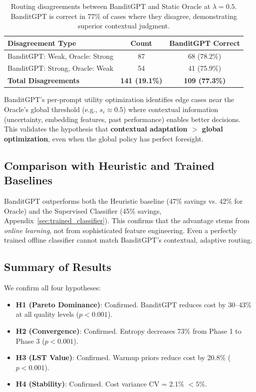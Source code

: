 \begin{table}[h]
\centering
\small
\begin{tabular}{@{}lcc@{}}
\toprule
\textbf{Disagreement Type} & \textbf{Count} & \textbf{BanditGPT Correct} \\ \midrule
BanditGPT: Weak, Oracle: Strong & 87 & 68 (78.2\%) \\
BanditGPT: Strong, Oracle: Weak & 54 & 41 (75.9\%) \\
\midrule
\textbf{Total Disagreements} & \textbf{141 (19.1\%)} & \textbf{109 (77.3\%)} \\
\bottomrule
\end{tabular}
\caption{%
    Routing disagreements between BanditGPT and Static Oracle at $\lambda=0.5$. 
    BanditGPT is correct in 77\% of cases where they disagree, demonstrating superior contextual judgment.
}
\label{tab:disagreements}
\end{table}

BanditGPT's per-prompt utility optimization identifies edge cases near the Oracle's global threshold (e.g., $s_i \approx 0.5$) where contextual information (uncertainty, embedding features, past performance) enables better decisions. This validates the hypothesis that \textbf{contextual adaptation $>$ global optimization}, even when the global policy has perfect foresight.

\subsection{Comparison with Heuristic and Trained Baselines}

BanditGPT outperforms both the Heuristic baseline (47\% savings vs. 42\% for Oracle) and the Supervised Classifier (45\% savings, Appendix~\ref{sec:trained_classifier}). This confirms that the advantage stems from \emph{online learning}, not from sophisticated feature engineering. Even a perfectly trained offline classifier cannot match BanditGPT's contextual, adaptive routing.

\subsection{Summary of Results}

We confirm all four hypotheses:

\begin{itemize}
    \item \textbf{H1 (Pareto Dominance)}: Confirmed. BanditGPT reduces cost by 30--43\% at all quality levels ($p < 0.001$).
    \item \textbf{H2 (Convergence)}: Confirmed. Entropy decreases 73\% from Phase 1 to Phase 3 ($p < 0.001$).
    \item \textbf{H3 (LST Value)}: Confirmed. Warmup priors reduce cost by 20.8\% ($p < 0.001$).
    \item \textbf{H4 (Stability)}: Confirmed. Cost variance CV = 2.1\% $< 5\%$.
\end{itemize}

